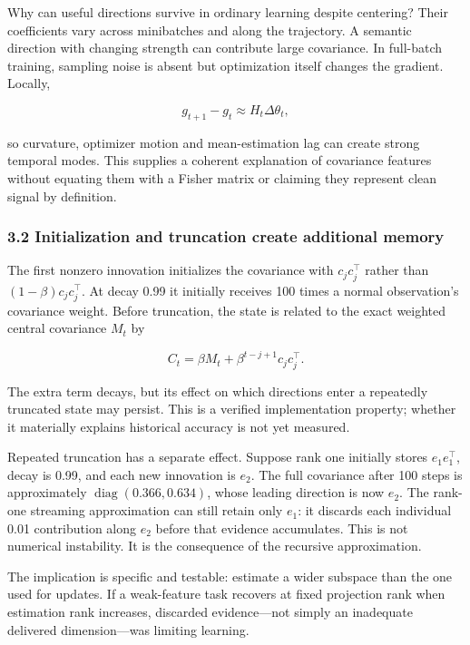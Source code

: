 \documentclass[
  british,
  10pt,
  a4paper,
]{article}
\begin{document}
Why can useful directions survive in ordinary learning despite
centering? Their coefficients vary across minibatches and along the
trajectory.\allowbreak{} A semantic direction with changing strength can
contribute large covariance.\allowbreak{} In full-batch training,
sampling noise is absent but optimization itself changes the gradient.
Locally,

\[
g_{t+1}-g_t\approx H_t\Delta\theta_t,
\]

so curvature, optimizer motion and mean-\allowbreak{}estimation lag can
create strong temporal modes. This supplies a coherent explanation of
covariance features without equating them with a Fisher matrix or
claiming they represent clean signal by definition.\allowbreak{}

\subsubsection{3.2 Initialization and truncation create additional
memory}\label{synthesis--initialization-and-truncation-create-additional-memory}

The first nonzero innovation initializes the covariance with
\(c_jc_j^\top\) rather than \((1-\beta)c_jc_j^\top\). At decay 0.99 it
initially receives 100 times a normal observation's covariance weight.
Before truncation,\allowbreak{} the state is related to the exact
weighted central covariance \(M_t\) by

\[
C_t=\beta M_t+\beta^{t-j+1}c_jc_j^\top.
\]

The extra term decays, but its effect on which directions enter a
repeatedly truncated state may persist. This is a verified
implementation property; whether it materially explains historical
accuracy is not yet measured.

Repeated truncation has a separate effect. Suppose rank one initially
stores \(e_1e_1^\top\), decay is 0.99, and each new innovation is
\(e_2\). The full covariance after 100 steps is approximately
\(\operatorname{diag}(0.366,0.634)\), whose leading direction is now
\(e_2\). The rank-one streaming approximation can still retain only
\(e_1\): it discards each individual 0.01 contribution along \(e_2\)
before that evidence accumulates.\allowbreak{} This is not numerical
instability.\allowbreak{} It is the consequence of the recursive
approximatio\allowbreak{}n.\allowbreak{}

The implication is specific and testable: estimate a wider subspace than
the one used for updates. If a weak-\allowbreak{}feature task recovers
at fixed projection rank when estimation rank increases, discarded
evidence---not simply an inadequate delivered dimension---was limiting
learning.
\end{document}
